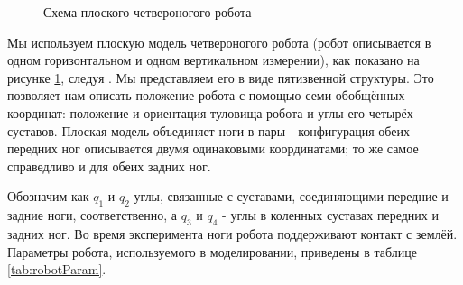 \begin{figure}[ht]
	\caption{Схема плоского четвероногого робота}\label{fig:robotSagital}
\end{figure} 
Мы используем плоскую модель четвероногого робота (робот описывается в одном горизонтальном и одном вертикальном измерении), как показано на рисунке \ref{fig:robotSagital}, следуя \cite{RobotConfig}. Мы представляем его в виде пятизвенной структуры. Это позволяет нам описать положение робота с помощью семи обобщённых координат: положение и ориентация туловища робота и углы его четырёх суставов. Плоская модель объединяет ноги в пары - конфигурация обеих передних ног описывается двумя одинаковыми координатами; то же самое справедливо и для обеих задних ног. 

Обозначим как $q_1$ и $q_2$ углы, связанные с суставами, соединяющими передние и задние ноги, соответственно, а $q_3$ и $q_4$ - углы в коленных суставах передних и задних ног. Во время эксперимента ноги робота поддерживают контакт с землёй. Параметры робота, используемого в моделировании, приведены в таблице \ref{tab:robotParam}.

